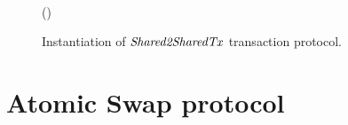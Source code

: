 \begin{figure}
\begin{center}
{\begin{varwidth}{\textwidth}
{              \< \< \\
            \varSigFin \opFunResult \procFinSig{\varSigAlice}{\varSigBob} \< \< \\
            \varExcess \opAssign {} \opAddPoint {} \< \< \\
            \scriptstyle \pcreturn \varTx \opAssign \varTx \opUnion (\varExcess \opSeperate \varSigFin \opSeperate \varProof)
            }
        \end{varwidth}
        }
    \end{center}
    \caption{Instantiation of $\mathit{Shared2SharedTx}$ transaction protocol. \label{fig:Mu2MuTx}}
\end{figure}


\section{Atomic Swap protocol}\label{sec:atomic-swap}